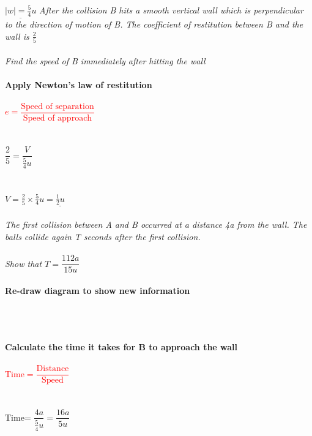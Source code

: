 \documentclass{article}[18pt]
\begin{document}
$\underline{|w|=\frac{5}{4}u}$
\newpage
\textit{After the collision B hits a smooth vertical wall which is perpendicular to the direction of
motion of B. The coefficient of restitution between B and the wall is $\frac{2}{5}$}\\
\\
\textit{Find the speed of B immediately after hitting the wall}\\
\\
\textbf{Apply Newton's law of restitution}\\
\\
\textcolor{red}{$e=\dfrac{\text{Speed of separation}}{\text{Speed of approach}}$}\\
\\
\\
$\dfrac{2}{5}=\dfrac{V}{\frac{5}{4}u}$\\
\\
\\
$V=\frac{2}{5}\times\frac{5}{4}u=\underline{\frac{1}{2}u}$\\
\\
\textit{The first collision between A and B occurred at a distance 4a from the wall. The balls collide
again T seconds after the first collision.}\\
\\
\textit{Show that $T=\dfrac{112a}{15u}$}\\
\\
\textbf{Re-draw diagram to show new information}\\
\\
\\
\\
\textbf{Calculate the time it takes for B to approach the wall}\\
\\
\textcolor{red}{Time$=\dfrac{\text{Distance}}{\text{Speed}}$}\\
\\
\\
Time= $\dfrac{4a}{\frac{5}{4}u}=\dfrac{16a}{5u}$\\
\\
\end{document}
